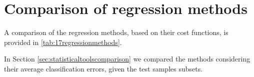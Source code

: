 \section{Comparison of regression methods}
\label{sec:comparisonofregressionmethods}

A comparison of the regression methods, based on their cost functions, is
provided in \ref{tab:17regressionmethods}.

In Section \ref{sec:statisticaltoolscomparison} we compared the methods
considering their average classification errors, given the test samples subsets.
